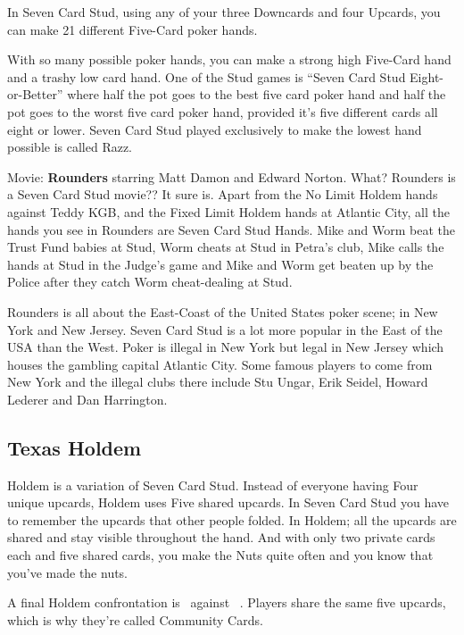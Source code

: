 
In Seven Card Stud, using any of your three Downcards and four
Upcards, you can make 21 different Five-Card poker hands.

With so many possible poker hands, you can make a strong high
Five-Card hand and a trashy low card hand. One of the Stud games is
``Seven Card Stud Eight-or-Better'' where half the pot goes to the
best five card poker hand and half the pot goes to the worst five card
poker hand, provided it's five different cards all eight or lower.
Seven Card Stud played exclusively to make the lowest hand possible is
called Razz.

Movie: \textbf{Rounders} starring Matt Damon and Edward Norton.
What? Rounders is a Seven Card Stud movie?? It sure is. Apart from the
No Limit Holdem hands against Teddy KGB, and the Fixed Limit Holdem
hands at Atlantic City, all the hands you see in Rounders are Seven
Card Stud Hands. Mike and Worm beat the Trust Fund babies at Stud,
Worm cheats at Stud in Petra's club, Mike calls the hands at Stud in
the Judge's game and Mike and Worm get beaten up by the Police after
they catch Worm cheat-dealing at Stud.

Rounders is all about the East-Coast of the United States poker scene;
in New York and New Jersey. Seven Card Stud is a lot more
popular in the East of the USA than the West. Poker is illegal in
New York but legal in New Jersey which houses the gambling capital
Atlantic City. Some famous players to come from New York and the illegal
clubs there include Stu Ungar, Erik Seidel, Howard Lederer and Dan Harrington.

\subsection{Texas Holdem}

Holdem is a variation of Seven Card Stud. Instead of everyone
having Four unique upcards, Holdem uses Five shared upcards. In Seven
Card Stud you have to remember the upcards that other people
folded. In Holdem; all the upcards are shared and stay visible
throughout the hand. And with only two private cards each and five
shared cards, you make the Nuts quite often and you know that you've
made the nuts.

A final Holdem confrontation is
\back\back\nines\Qd\Jd\tres\fourc\ against
\back\back\nines\Qd\Jd\tres\fourc\ . Players share the same five
upcards, which is why they're called Community Cards.

